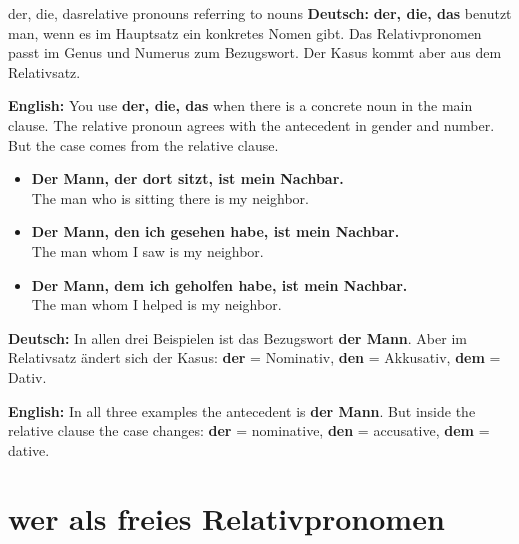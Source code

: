 \documentclass[a4paper,11pt]{article}
\newcommand{\GermanText}[1]{\textbf{Deutsch: }#1\par}
\newcommand{\EnglishText}[1]{{\small\color{SoftGray}\textbf{English: }#1\par}}
\newcommand{\ExampleItem}[2]{\item \textbf{#1}\\{\small\color{SoftGray}#2}}
\begin{document}
\begin{grammarentry}{der, die, das}{relative pronouns referring to nouns}
\GermanText{\textbf{der, die, das} benutzt man, wenn es im Hauptsatz ein konkretes Nomen gibt. Das Relativpronomen passt im Genus und Numerus zum Bezugswort. Der Kasus kommt aber aus dem Relativsatz.}
\EnglishText{You use \textbf{der, die, das} when there is a concrete noun in the main clause. The relative pronoun agrees with the antecedent in gender and number. But the case comes from the relative clause.}

\begin{exbox}
\begin{itemize}
    \ExampleItem{Der Mann, der dort sitzt, ist mein Nachbar.}{The man who is sitting there is my neighbor.}
    \ExampleItem{Der Mann, den ich gesehen habe, ist mein Nachbar.}{The man whom I saw is my neighbor.}
    \ExampleItem{Der Mann, dem ich geholfen habe, ist mein Nachbar.}{The man whom I helped is my neighbor.}
\end{itemize}
\end{exbox}

\GermanText{In allen drei Beispielen ist das Bezugswort \textbf{der Mann}. Aber im Relativsatz ändert sich der Kasus: \textbf{der} = Nominativ, \textbf{den} = Akkusativ, \textbf{dem} = Dativ.}
\EnglishText{In all three examples the antecedent is \textbf{der Mann}. But inside the relative clause the case changes: \textbf{der} = nominative, \textbf{den} = accusative, \textbf{dem} = dative.}
\end{grammarentry}

\section{wer als freies Relativpronomen}
\end{document}
